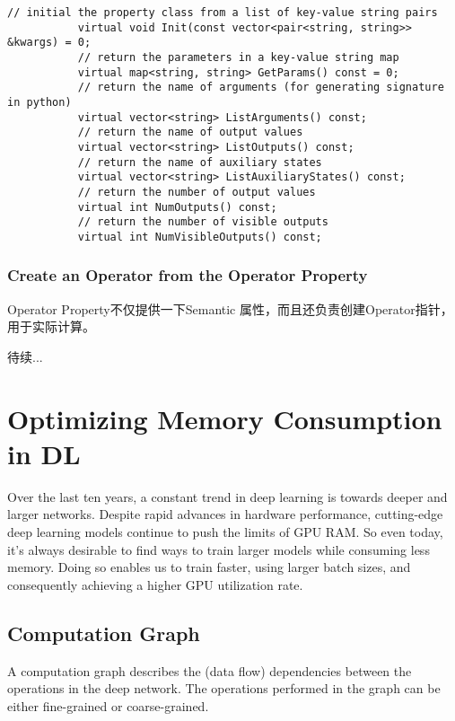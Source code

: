 \begin{itemize}
\begin{lstlisting}
// initial the property class from a list of key-value string pairs
           virtual void Init(const vector<pair<string, string>> &kwargs) = 0;
           // return the parameters in a key-value string map
           virtual map<string, string> GetParams() const = 0;
           // return the name of arguments (for generating signature in python)
           virtual vector<string> ListArguments() const;
           // return the name of output values
           virtual vector<string> ListOutputs() const;
           // return the name of auxiliary states
           virtual vector<string> ListAuxiliaryStates() const;
           // return the number of output values
           virtual int NumOutputs() const;
           // return the number of visible outputs
           virtual int NumVisibleOutputs() const;

\end{lstlisting}

\end{itemize}

\subsubsection{Create an Operator from the Operator Property}

Operator Property不仅提供一下Semantic 属性，而且还负责创建Operator指针，用于实际计算。

待续...


\section{Optimizing Memory Consumption in DL}
Over the last ten years, a constant trend in deep learning is towards deeper and larger networks. Despite rapid advances in hardware performance, cutting-edge deep learning models continue to push the limits of GPU RAM. So even today, it’s always desirable to find ways to train larger models while consuming less memory. Doing so enables us to train faster, using larger batch sizes, and consequently achieving a higher GPU utilization rate.

\subsection{Computation Graph}
A computation graph describes the (data flow) dependencies between the operations in the deep network. The operations performed in the graph can be either fine-grained or coarse-grained.

